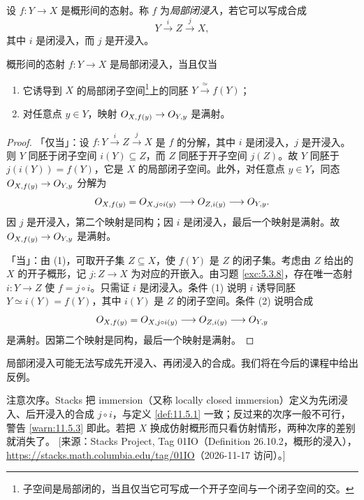 \begin{definition}\label{def:11.5.1}
设 $f \colon Y \to X$ 是概形间的态射。称 $f$ 为\emph{局部闭浸入}，若它可以写成合成
\[
Y \xrightarrow{\ i\ } Z \xrightarrow{\ j\ } X,
\]
其中 $i$ 是闭浸入，而 $j$ 是开浸入。
\end{definition}

\begin{proposition}\label{prop:11.5.2}
概形间的态射 $f \colon Y \to X$ 是局部闭浸入，当且仅当
\begin{enumerate}[label=(\arabic*),leftmargin=2em,itemsep=0.25ex]
  \item 它诱导到 $X$ 的局部闭子空间\footnote{子空间是局部闭的，当且仅当它可写成一个开子空间与一个闭子空间的交。}上的同胚 $Y \xrightarrow{\ \simeq\ } f(Y)$；
  \item 对任意点 $y \in Y$，映射 $O_{X,f(y)} \to O_{Y,y}$ 是满射。
\end{enumerate}
\end{proposition}

\begin{proof}
「仅当」：设 $f \colon Y \xrightarrow{i} Z \xrightarrow{j} X$ 是 $f$ 的分解，其中 $i$ 是闭浸入，$j$ 是开浸入。则 $Y$ 同胚于闭子空间 $i(Y) \subseteq Z$，而 $Z$ 同胚于开子空间 $j(Z)$。故 $Y$ 同胚于 $j(i(Y)) = f(Y)$，它是 $X$ 的局部闭子空间。此外，对任意点 $y \in Y$，同态 $O_{X,f(y)} \to O_{Y,y}$ 分解为
\[
O_{X,f(y)} = O_{X,j \circ i(y)} \longrightarrow O_{Z,i(y)} \longrightarrow O_{Y,y}.
\]
因 $j$ 是开浸入，第二个映射是同构；因 $i$ 是闭浸入，最后一个映射是满射。故 $O_{X,f(y)} \to O_{Y,y}$ 是满射。

「当」：由 (1)，可取开子集 $Z \subseteq X$，使 $f(Y)$ 是 $Z$ 的闭子集。考虑由 $Z$ 给出的 $X$ 的开子概形，记 $j \colon Z \to X$ 为对应的开嵌入。由习题 \ref{exc:5.3.8}，存在唯一态射 $i \colon Y \to Z$ 使 $f = j \circ i$。只需证 $i$ 是闭浸入。条件 (1) 说明 $i$ 诱导同胚 $Y \simeq i(Y) = f(Y)$，其中 $i(Y)$ 是 $Z$ 的闭子空间。条件 (2) 说明合成
\[
O_{X,f(y)} = O_{X,j \circ i(y)} \longrightarrow O_{Z,i(y)} \longrightarrow O_{Y,y}
\]
是满射。因第二个映射是同构，最后一个映射是满射。
\end{proof}

\begin{warning}\label{warn:11.5.3}
局部闭浸入可能无法写成先开浸入、再闭浸入的合成。我们将在今后的课程中给出反例。
\end{warning}

\begin{yizhu}
注意次序。Stacks 把 immersion（又称 locally closed immersion）定义为先闭浸入、后开浸入的合成 $j \circ i$，与定义 \ref{def:11.5.1} 一致；反过来的次序一般不可行，警告 \ref{warn:11.5.3} 即此。若把 $X$ 换成仿射概形而只看仿射情形，两种次序的差别就消失了。
[来源：Stacks Project, Tag 01IO（Definition 26.10.2，概形的浸入），\url{https://stacks.math.columbia.edu/tag/01IO}（2026-11-17 访问）。]
\end{yizhu}
